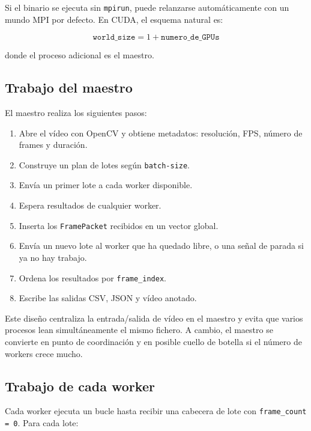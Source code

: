 \documentclass[12pt,a4paper]{article}
\begin{document}
Si el binario se ejecuta sin \texttt{mpirun}, puede relanzarse autom\'aticamente con un mundo
MPI por defecto. En CUDA, el esquema natural es:

\[
    \texttt{world\_size} = 1 + \texttt{numero\_de\_GPUs}
\]

donde el proceso adicional es el maestro.

\subsection{Trabajo del maestro}

El maestro realiza los siguientes pasos:

\begin{enumerate}
    \item Abre el v\'ideo con OpenCV y obtiene metadatos: resoluci\'on, FPS, n\'umero de frames y duraci\'on.
    \item Construye un plan de lotes seg\'un \texttt{batch-size}.
    \item Env\'ia un primer lote a cada worker disponible.
    \item Espera resultados de cualquier worker.
    \item Inserta los \texttt{FramePacket} recibidos en un vector global.
    \item Env\'ia un nuevo lote al worker que ha quedado libre, o una se\~nal de parada si ya no hay trabajo.
    \item Ordena los resultados por \texttt{frame\_index}.
    \item Escribe las salidas CSV, JSON y v\'ideo anotado.
\end{enumerate}

Este dise\~no centraliza la entrada/salida de v\'ideo en el maestro y evita que varios procesos
lean simult\'aneamente el mismo fichero. A cambio, el maestro se convierte en punto de
coordinaci\'on y en posible cuello de botella si el n\'umero de workers crece mucho.

\subsection{Trabajo de cada worker}

Cada worker ejecuta un bucle hasta recibir una cabecera de lote con \texttt{frame\_count = 0}.
Para cada lote:
\end{document}
